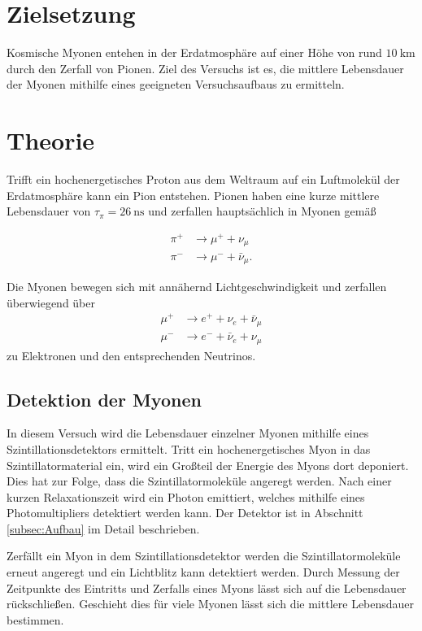 \section{Zielsetzung}
\label{sec:Zielsetzung}
Kosmische Myonen entehen in der Erdatmosphäre auf einer Höhe von rund $\qty{10}{\kilo\metre}$ durch den Zerfall von Pionen. Ziel des Versuchs ist es, die 
mittlere Lebensdauer der Myonen mithilfe eines geeigneten Versuchsaufbaus zu ermitteln.


\section{Theorie}
\label{sec:Theorie}
Trifft ein hochenergetisches Proton aus dem Weltraum auf ein Luftmolekül der Erdatmosphäre kann ein Pion entstehen. Pionen haben eine kurze mittlere 
Lebensdauer von $\tau_\pi = \qty{26}{\nano\second}$ und zerfallen hauptsächlich in Myonen gemäß

\begin{align*}
    \pi^+ &\to \mu^+ + \nu_\mu \\
    \pi^- &\to \mu^- + \bar{\nu}_\mu.
\end{align*}

Die Myonen bewegen sich mit annähernd Lichtgeschwindigkeit und zerfallen überwiegend über 
\begin{align*}
    \mu^+ &\to e^+ + \nu_e + \bar{\nu}_\mu \\
    \mu^- &\to e^- + \bar{\nu}_e + \nu_\mu
\end{align*}
zu Elektronen und den entsprechenden Neutrinos.

\subsection{Detektion der Myonen}
\label{subsec:Detektion der Myonen}
In diesem Versuch wird die Lebensdauer einzelner Myonen mithilfe eines Szintillationsdetektors ermittelt. Tritt ein hochenergetisches Myon in das Szintillatormaterial
ein, wird ein Großteil der Energie des Myons dort deponiert. Dies hat zur Folge, dass die Szintillatormoleküle angeregt werden. Nach einer kurzen Relaxationszeit
wird ein Photon emittiert, welches mithilfe eines Photomultipliers detektiert werden kann. Der Detektor ist in Abschnitt \ref{subsec:Aufbau} im Detail beschrieben.

Zerfällt ein Myon in dem Szintillationsdetektor werden die Szintillatormoleküle erneut angeregt und ein Lichtblitz kann detektiert werden. Durch Messung der Zeitpunkte des Eintritts
und Zerfalls eines Myons lässt sich auf die Lebensdauer rückschließen. Geschieht dies für viele Myonen lässt sich die mittlere Lebensdauer bestimmen.

